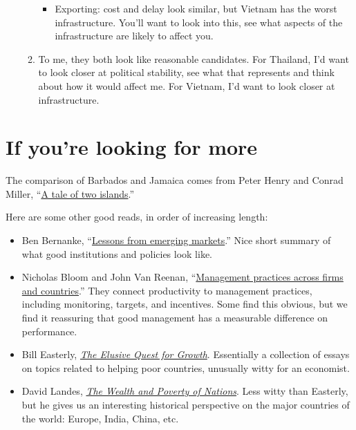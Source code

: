 \begin{enumerate}
\begin{enumerate}
\begin{itemize}
\item Exporting:  cost and delay look similar, but Vietnam
has the worst infrastructure.
You'll want to look into this, see what aspects of the infrastructure
are likely to affect you.
\end{itemize}

\item 
To me, they both look like reasonable candidates.
For Thailand, I'd want to look closer at political stability,
see what that represents and think about how it would affect me.
For Vietnam, I'd want to look closer at infrastructure.
\end{enumerate}


\end{enumerate}
\setlength{\leftmargini}{\oldleftmargini}


\section*{If you're looking for more}

The comparison of Barbados and Jamaica comes from Peter Henry and Conrad Miller,
``\href{{http://www.aeaweb.org/articles.php?doi=10.1257/aer.99.2.261}}
{A tale of two islands}.''

Here are some other good reads, in order of increasing length:
\begin{itemize}
\item Ben Bernanke,
``\href{http://www.federalreserve.gov/newsevents/speech/Bernanke20110928a.htm}
{Lessons from emerging markets}.''
Nice short summary of what good institutions and policies look like.

\item Nicholas Bloom and John Van Reenan,
``\href{http://www.aeaweb.org/articles.php?doi=10.1257/jep.24.1.203}
    {Management practices across firms and countries}.''
They connect productivity to management practices, including
monitoring, targets, and incentives.
Some find this obvious, but we find it reassuring that
good management has a measurable difference
on performance.

\item Bill Easterly,
\href{http://www.amazon.com/Elusive-Quest-Growth-Economists-Misadventures/dp/0262550423}
{\it The Elusive Quest for Growth}.
Essentially a collection of essays on topics related to helping poor countries,
unusually witty for an economist.

\item David Landes,
\href{http://www.amazon.com/Wealth-Poverty-Nations-Some-Rich/dp/0393318885}
{\it The Wealth and Poverty of Nations}.
Less witty than Easterly, but he gives us an interesting historical
perspective on the major countries of the world:  Europe, India, China, etc.
\end{itemize}

